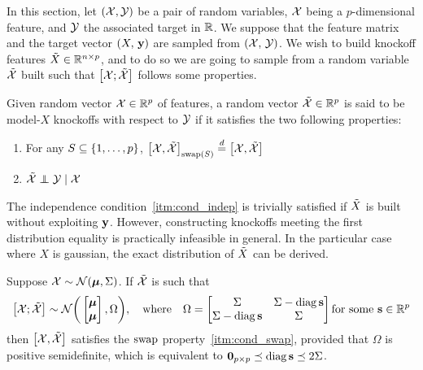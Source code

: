 In this section, let $(\mathcal{X}, \mathcal{Y})$ be a pair of random variables,
$\mathcal{X}$ being a $p$-dimensional feature,
and $\mathcal{Y}$ the associated target in $\mathbb{R}$.
We suppose that the feature matrix and the target vector $(X,\, \mathbf{y})$ are sampled from $(\mathcal{X},\, \mathcal{Y})$.
We wish to build knockoff features $\tilde{X} \in \mathbb{R}^{n \times p}$, and to do so we are going to sample from a
random variable $\tilde{\mathcal{X}}$ built such that $\big[ \mathcal{X}; \tilde{\mathcal{X}} \big]$ follows some properties.

\begin{definition}
Given random vector $\mathcal{X} \in \mathbb{R}^p$ of features,
a random vector $\tilde{\mathcal{X}} \in \mathbb{R}^p$ is said to be model-$X$ knockoffs with respect to $\mathcal{Y}$
if it satisfies the two following properties:
\begin{enumerate}[label=\textbf{S.\arabic*},ref=S.\arabic*]
        \item \label{itm:cond_swap} For any $S \subseteq \left\{ 1, \dots, p \right\}$,
                $\big[ \mathcal{X}, \tilde{\mathcal{X}} \big]_{\operatorname{swap}(S)} \stackrel{d}{=} \big[ \mathcal{X}, \tilde{\mathcal{X}} \big]$
        \item \label{itm:cond_indep} $\tcX \independent \cY \mid \cX$
\end{enumerate}
\end{definition}
The independence condition~\ref{itm:cond_indep} is trivially satisfied if $\tilde{X}$ is built without exploiting $\mathbf{y}$.
However, constructing knockoffs meeting the first distribution equality is practically infeasible in general.
In the particular case where $X$ is gaussian, the exact distribution of $\tilde{X}$ can be derived.
\begin{proposition}
        Suppose $\mathcal{X} \sim \mathcal{N}(\bm{\mu}, \Sigma)$.
        If $\tilde{\mathcal{X}}$ is such that
        \begin{equation*}
                \big[ \mathcal{X}; \tilde{\mathcal{X}} \big] \sim \mathcal{N}\bigg(\begin{bmatrix} \bm{\mu}\\ \bm{\mu} \end{bmatrix}, \Omega\bigg)
                ,\quad\text{where}\quad
                \Omega = \begin{bmatrix}
                         \Sigma & \Sigma - \operatorname*{diag} \mathbf{s}\\
                         \Sigma - \operatorname*{diag} \mathbf{s} & \Sigma
                \end{bmatrix}
                \text{for some }
                \mathbf{s} \in \mathbb{R}^p
        \end{equation*}
        then $\big[\mathcal{X}, \tilde{\mathcal{X}} \big]$ satisfies the $\operatorname{swap}$ property~\ref{itm:cond_swap},
        provided that $\Omega$ is positive semidefinite,
        which is equivalent to $\mathbf{0}_{p \times p} \preceq \operatorname*{diag} \mathbf{s} \preceq 2\Sigma$.
\end{proposition}\label{prop:gaussian_knockoffs}

